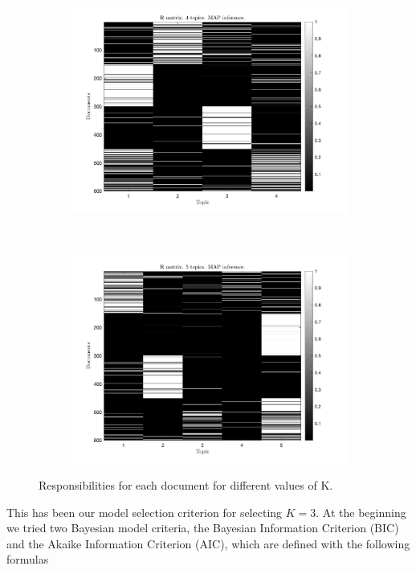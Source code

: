 \documentclass[12pt]{article}
\begin{document}
\begin{figure}[hb]
\begin{subfigure}{0.4\textwidth}
		\includegraphics[width=\textwidth]{images/MAP/R_map_4_topics.jpg}
		\caption{}
		\label{fig:R_MAP_4}
	\end{subfigure}
	~
	\begin{subfigure}{0.4\textwidth}
		\includegraphics[width=\textwidth]{images/MAP/R_map_5_topics.jpg}
		\caption{}
		\label{fig:R_MAP_5}
	\end{subfigure}
	
	\caption{Responsibilities for each document for different values of K.}
	\label{fig:R_MAP}
\end{figure}

This has been our model selection criterion for selecting $K=3$. At the beginning we tried two Bayesian model criteria, the Bayesian Information Criterion (BIC) and the Akaike Information Criterion (AIC), which are defined with the following formulas
\end{document}
